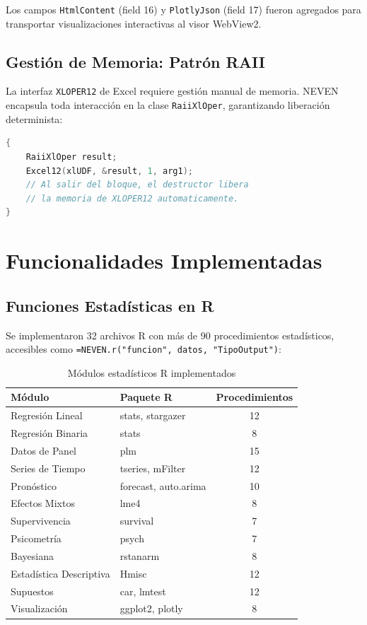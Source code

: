 \documentclass[12pt, a4paper]{report}
\begin{document}
Los campos \texttt{HtmlContent} (field 16) y \texttt{PlotlyJson} (field 17) fueron agregados para transportar visualizaciones interactivas al visor WebView2.

\section{Gestión de Memoria: Patrón RAII}

La interfaz \texttt{XLOPER12} de Excel requiere gestión manual de memoria. NEVEN encapsula toda interacción en la clase \texttt{RaiiXlOper}, garantizando liberación determinista:

\begin{lstlisting}[language=C++, caption={Patrón RAII para XLOPER12}]
{
    RaiiXlOper result;
    Excel12(xlUDF, &result, 1, arg1);
    // Al salir del bloque, el destructor libera
    // la memoria de XLOPER12 automaticamente.
}
\end{lstlisting}

\chapter{Funcionalidades Implementadas}

\section{Funciones Estadísticas en R}

Se implementaron 32 archivos R con más de 90 procedimientos estadísticos, accesibles como \texttt{=NEVEN.r("funcion", datos, "TipoOutput")}:

\begin{table}[H]
\centering
\begin{tabular}{llc}
\toprule
\textbf{Módulo} & \textbf{Paquete R} & \textbf{Procedimientos} \\
\midrule
Regresión Lineal & stats, stargazer & 12 \\
Regresión Binaria & stats & 8 \\
Datos de Panel & plm & 15 \\
Series de Tiempo & tseries, mFilter & 12 \\
Pronóstico & forecast, auto.arima & 10 \\
Efectos Mixtos & lme4 & 8 \\
Supervivencia & survival & 7 \\
Psicometría & psych & 7 \\
Bayesiana & rstanarm & 8 \\
Estadística Descriptiva & Hmisc & 12 \\
Supuestos & car, lmtest & 12 \\
Visualización & ggplot2, plotly & 8 \\
\bottomrule
\end{tabular}
\caption{Módulos estadísticos R implementados}
\end{table}
\end{document}
